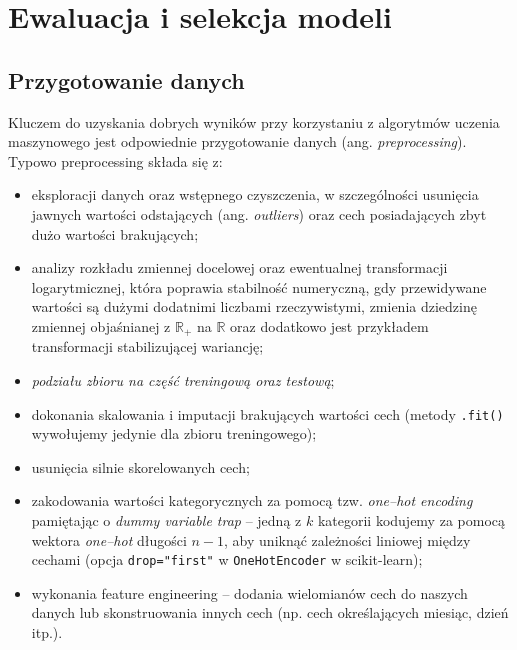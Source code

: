 \documentclass{myclass}
\begin{document}


\section{Ewaluacja i selekcja modeli}

\subsection{Przygotowanie danych}

Kluczem do uzyskania dobrych wyników przy korzystaniu z algorytmów uczenia maszynowego jest
odpowiednie przygotowanie danych (ang. \emph{preprocessing}). Typowo preprocessing składa się z:

\begin{itemize}
\item eksploracji danych oraz wstępnego czyszczenia, w szczególności usunięcia jawnych wartości
odstających (ang. \emph{outliers}) oraz cech posiadających zbyt dużo wartości brakujących;

\item analizy rozkładu zmiennej docelowej oraz ewentualnej transformacji logarytmicznej, która
poprawia stabilność numeryczną, gdy przewidywane wartości są dużymi dodatnimi liczbami
rzeczywistymi, zmienia dziedzinę zmiennej objaśnianej z \(\mathbb{R}_+\) na \(\mathbb{R}\) oraz
dodatkowo jest przykładem transformacji stabilizującej wariancję;
    
\item \emph{podziału zbioru na część treningową oraz testową};

\item dokonania skalowania i imputacji brakujących wartości cech (metody \texttt{.fit()} wywołujemy
jedynie dla zbioru treningowego);

\item usunięcia silnie skorelowanych cech;

\item zakodowania wartości kategorycznych za pomocą tzw. \emph{one--hot encoding} pamiętając o
\emph{dummy variable trap} -- jedną z \(k\) kategorii kodujemy za pomocą wektora \emph{one--hot}
długości \(n-1\), aby uniknąć zależności liniowej między cechami (opcja \texttt{drop="first"} w
\texttt{OneHotEncoder} w scikit-learn);

\item wykonania feature engineering -- dodania wielomianów cech do naszych danych lub skonstruowania
innych cech (np. cech określających miesiąc, dzień itp.).
\end{itemize}
\end{document}
